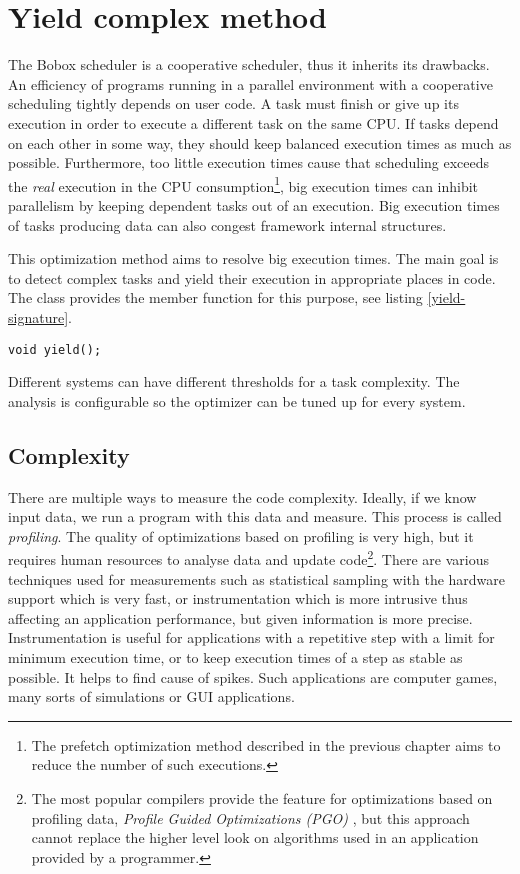 \chapter{Yield complex method}
\label{yield-intro}
The Bobox scheduler is a cooperative scheduler, thus it inherits its drawbacks. An efficiency of programs running in a parallel environment with a cooperative scheduling tightly depends on user code. A task must finish or give up its execution in order to execute a different task on the same CPU. If tasks depend on each other in some way, they should keep balanced execution times as much as possible. Furthermore, too little execution times cause that scheduling exceeds the \textit{real} execution in the CPU consumption\footnote{The prefetch optimization method described in the previous chapter aims to reduce the number of such executions.}, big execution times can inhibit parallelism by keeping dependent tasks out of an execution. Big execution times of tasks producing data can also congest framework internal structures.

This optimization method aims to resolve big execution times. The main goal is to detect complex tasks and yield their execution in appropriate places in code. The  class provides the member function for this purpose, see listing \ref{yield-signature}.

\begin{lstlisting}[caption={The signature of the yield execution function.}, label={yield-signature}]
void yield();
\end{lstlisting}

Different systems can have different thresholds for a task complexity. The analysis is configurable so the optimizer can be tuned up for every system.

\section{Complexity}
\label{yield-complexity}
There are multiple ways to measure the code complexity. Ideally, if we know input data, we run a program with this data and measure. This process is called \emph{profiling}. The quality of optimizations based on profiling is very high, but it requires human resources to analyse data and update code\footnote{The most popular compilers provide the feature for optimizations based on profiling data, \emph{Profile Guided Optimizations (PGO)} \cite{pgo}, but this approach cannot replace the higher level look on algorithms used in an application provided by a programmer.}. There are various techniques used for measurements such as statistical sampling with the hardware support which is very fast, or instrumentation which is more intrusive thus affecting an application performance, but given information is more precise. Instrumentation is useful for applications with a repetitive step with a limit for minimum execution time, or to keep execution times of a step as stable as possible. It helps to find cause of spikes. Such applications are computer games, many sorts of simulations or GUI applications.

